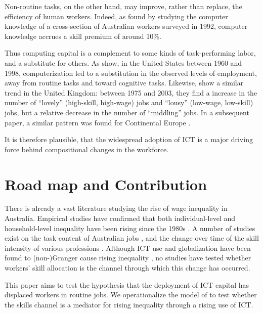 Non-routine tasks, on the other hand, may improve, rather than replace, the efficiency of human workers. Indeed, as \citet{Borland2004} found by studying the computer knowledge of a cross-section of Australian workers surveyed in 1992, computer knowledge accrues a skill premium of around 10\%.

Thus computing capital is a complement to some kinds of task-performing labor, and a substitute for others. As \citet{Levy2003} show, in the United States between 1960 and 1998, computerization led to a substitution in the observed levels of employment, away from routine tasks and toward cognitive tasks. Likewise, \citet{Goos2007} show a similar trend in the United Kingdom: between 1975 and 2003, they find a increase in the number of ``lovely'' (high-skill, high-wage) jobs and ``lousy'' (low-wage, low-skill) jobs, but a relative decrease in the number of ``middling'' jobs. In a subsequent paper, a similar pattern was found for Continental Europe \citep{Goos2009}.

It is therefore plausible, that the widespread adoption of ICT is a major driving force behind compositional changes in the workforce. 

\section{Road map and Contribution}

There is already a vast literature studying the rise of wage inequality in Australia. Empirical studies have confirmed that both individual-level and household-level inequality have been rising since the 1980s \citep{Borland1999,Leigh2005,Gaston2009}. A number of studies exist on the task content of Australian jobs \citep{Esposto2012a}, and the change over time of the skill intensity of various professions \citep{Esposto2012, Esposto2012a}. Although ICT use and globalization have been found to (non-)Granger cause rising inequality \citep{Gaston2009}, no studies have tested whether workers' skill allocation is the channel through which this change has occurred.

This paper aims to test the hypothesis that the deployment of ICT capital has displaced workers in routine jobs. We operationalize the model of \citep{Acemoglu2011} to test whether the skills channel is a mediator for rising inequality through a rising use of ICT.

